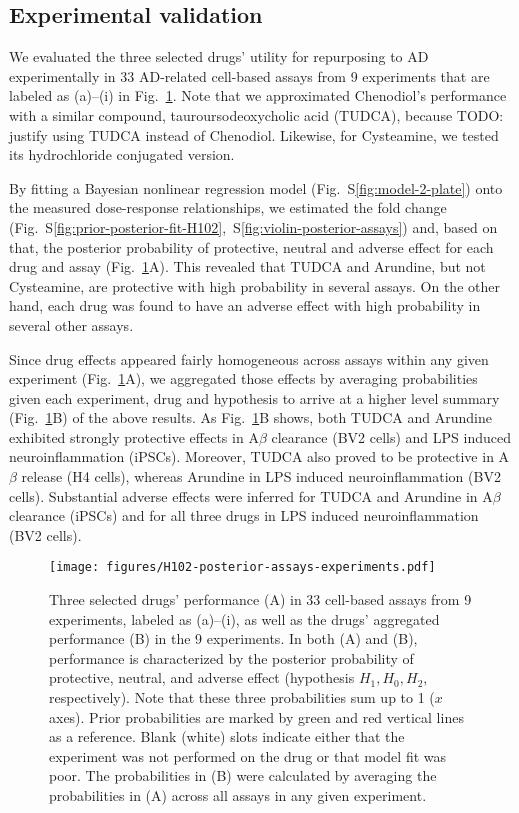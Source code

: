 \documentclass[letterpaper]{article}
\begin{document}
\subsection{Experimental validation}

We evaluated the three selected drugs' utility for repurposing to AD
experimentally in 33 AD-related cell-based assays from 9 experiments that are
labeled as (a)--(i) in Fig.~\ref{fig:cell-based-assays}.  Note that we
approximated Chenodiol's performance with a similar compound,
tauroursodeoxycholic acid (TUDCA), because TODO: justify using TUDCA instead
of Chenodiol.  Likewise, for Cysteamine, we tested its hydrochloride
conjugated version.

By fitting a Bayesian nonlinear regression model
(Fig.~S\ref{fig:model-2-plate}) onto the measured dose-response relationships,
we estimated the fold change
(Fig.~S\ref{fig:prior-posterior-fit-H102},~S\ref{fig:violin-posterior-assays})
and, based on that,
the posterior probability of protective, neutral and adverse effect for each
drug and assay (Fig.~\ref{fig:cell-based-assays}A).  This revealed that TUDCA
and Arundine, but not Cysteamine, are protective with high probability in
several assays. On the other hand, each drug was found to have an adverse
effect with high probability in several other assays.

Since drug effects appeared fairly homogeneous across assays within
any given experiment (Fig.~\ref{fig:cell-based-assays}A), we aggregated those
effects by averaging probabilities given each experiment, drug and hypothesis
to arrive at a higher level summary (Fig.~\ref{fig:cell-based-assays}B)
of the above results.  As Fig.~\ref{fig:cell-based-assays}B shows, both TUDCA
and Arundine exhibited strongly protective effects in A$\beta$ clearance (BV2 cells)
and LPS induced neuroinflammation (iPSCs).  Moreover, TUDCA also proved to be
protective in A$\beta$ release (H4 cells), whereas Arundine in LPS induced
neuroinflammation (BV2 cells).  Substantial adverse effects were inferred for
TUDCA and Arundine in A$\beta$ clearance (iPSCs) and for all three drugs in
LPS induced neuroinflammation (BV2 cells).

\begin{figure}
\texttt{[image: figures/H102-posterior-assays-experiments.pdf]}
\caption{Three selected drugs' performance (A) in 33 cell-based assays from 9
  experiments, labeled as (a)--(i), as well as the drugs' aggregated
  performance (B) in the 9 experiments.
  In both (A) and (B), performance is characterized by the posterior
  probability of protective, neutral, and adverse effect (hypothesis $H_1, H_0, H_2$,
  respectively).  Note that these three probabilities sum up to 1 ($x$ axes).
  Prior probabilities are marked by green and red vertical lines as a
  reference.  Blank (white) slots indicate either that the experiment was not
  performed on the drug or that model fit was poor.  The probabilities in (B)
  were calculated by averaging the probabilities in (A) across all assays in
  any given experiment. 
}
\label{fig:cell-based-assays}
\end{figure}
\end{document}

